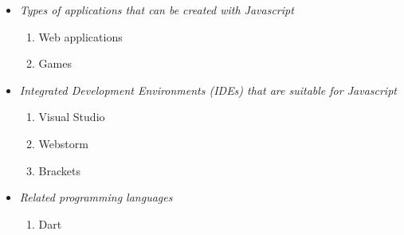 \documentclass{article}
\begin{document}
	
	\begin{itemize}
		\item \textit{Types of applications that can be created with Javascript}
		\begin{enumerate}
			\item Web applications
			\item Games
		\end{enumerate}
	    \item \textit{Integrated Development Environments (IDEs) that are suitable for Javascript}
	    \begin{enumerate}
	    	\item Visual Studio
	    	\item Webstorm
	    	\item Brackets
	    \end{enumerate}
    \item \textit{Related programming languages}
   \begin{enumerate}
    \item Dart
    \end{enumerate}
	\end{itemize}
\end{document}
